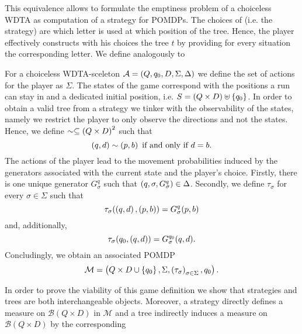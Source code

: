 This equivalence allows to formulate the emptiness problem of a choiceless
\ac{WDTA} as computation of a strategy for \acp{POMDP}. The choices of \eve{}
(i.e.  the strategy) are which letter is used at which position of the tree.
Hence, the player effectively constructs with his choices the tree $t$ by
providing for every situation the corresponding letter. We define analogously
to \cite[Section 3.5 Emptiness Problem]{RandAutoInfTrees}
\begin{definition}
  For a choiceless \ac{WDTA}-sceleton
  $\mathcal{A} = \left(Q, q_{0}, D, \Sigma, \Delta\right)$ we define the set of 
  actions for the player as $\Sigma$. The states of the game correspond with 
  the positions a run can stay in and a dedicated initial position, i.e. 
  $S = \left(Q\times D\right)\uplus\left\{q_{0}\right\}$. In order to obtain a valid tree
  from a strategy we tinker with the observability of the states, namely we
  restrict the player to only observe the directions and not the states. Hence,
  we define $\sim\subseteq\left(Q\times D\right)^{2}$ such that
  \begin{equation*}
    \left(q, d\right)\sim\left(p, b\right)\text{ if and only if }d = b.
  \end{equation*}
  The actions of the player lead to the movement probabilities induced by the
  generators associated with the current state and the player's choice. 
  Firstly, there is one unique generator $G_{\sigma}^{q}$ such that 
  $\left(q,\sigma,G_{\sigma}^{q}\right)\in\Delta$. Secondly, we define 
  $\tau_{\sigma}$ for every $\sigma\in\Sigma$ such that
  \begin{equation*}
    \tau_{\sigma}(\left(q,d\right),\left(p,b\right)) = G_{\sigma}^{q}(p,b)
  \end{equation*}
  and, additionally,
  \begin{equation*}
    \tau_{\sigma}(q_{0},\left(q,d\right)) = G_{\sigma}^{q_{0}}(q,d).
  \end{equation*}
  Concludingly, we obtain an associated \ac{POMDP}
  \begin{equation*}
    \mathcal{M} = \left(
      Q\times D\cup \left\{q_{0}\right\}, \Sigma, 
        \left(\tau_{\sigma}\right)_{\sigma\in\Sigma}, q_{0}
    \right).
  \end{equation*}
\end{definition}
In order to prove the viability of this game definition we show that strategies
and trees are both interchangeable objects. Moreover, a strategy directly
defines a measure on $\mathcal{B}(Q\times D)$ in $\mathcal{M}$ and a tree
indirectly induces a measure on $\mathcal{B}(Q\times D)$ by the corresponding
